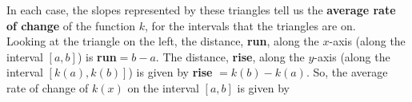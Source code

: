 \noindent In each case, the slopes represented by these triangles tell us the \textbf{average rate of change} of the function $k$, for the intervals that the triangles are on. \label{instantaneous roc} \\

\noindent Looking at the triangle on the left, the distance, \textbf{run}, along the $x$-axis (along the interval $[a,b]$) is \textbf{run}$ = b - a$. The distance, \textbf{rise}, along the $y$-axis (along the interval $[k(a),k(b)]$) is given by \textbf{rise} $ = k(b) - k(a)$. So, the average rate of change of $k(x)$ on the interval $[a,b]$ is given by \label{avg slope}
 
  	\bigskip
	
	\hfil{}
	\bigskip
	\bigskip


